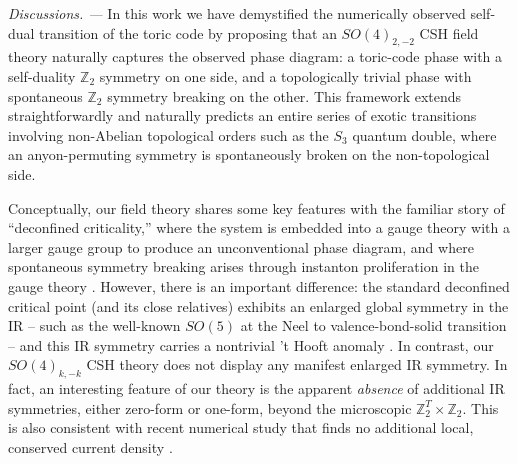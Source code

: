 \documentclass[aps, prl, superscriptaddress, twocolumn,
notitlepage, longbibliography,
floatfix]{revtex4-2}
\newcommand{\1}{\text{\uppercase\expandafter{\romannumeral1}}}
\newcommand{\2}{\text{\uppercase\expandafter{\romannumeral2}}}
\newcommand{\3}{\text{\uppercase\expandafter{\romannumeral3}}}
\newcommand{\4}{\text{\uppercase\expandafter{\romannumeral4}}}
\newcommand{\5}{\text{\uppercase\expandafter{\romannumeral5}}}
\newcommand{\6}{\text{\uppercase\expandafter{\romannumeral6}}}
\def\Z{\mathbb{Z}}
\begin{document}
\textit{Discussions. ---}
In this work we have demystified the numerically observed self-dual transition of the toric code by proposing that an $SO(4)_{2,-2}$ CSH field theory naturally captures the observed phase diagram: a toric-code phase with a self-duality $\mathbb{Z}_2$ symmetry on one side, and a topologically trivial phase with spontaneous $\mathbb{Z}_2$ symmetry breaking on the other. This framework extends straightforwardly and naturally predicts an entire series of exotic transitions involving non-Abelian topological orders such as the $S_3$ quantum double, where an anyon-permuting symmetry is spontaneously broken on the non-topological side.

Conceptually, our field theory shares some key features with the familiar story of ``deconfined criticality,'' where the system is embedded into a gauge theory with a larger gauge group to produce an unconventional phase diagram, and where spontaneous symmetry breaking arises through instanton proliferation in the gauge theory \cite{deconfine1,deconfine2}. However, there is an important difference: the standard deconfined critical point (and its close relatives) exhibits an enlarged global symmetry in the IR -- such as the well-known $SO(5)$ at the Neel to valence-bond-solid transition -- and this IR symmetry carries a nontrivial 't Hooft anomaly \cite{SO(5),SO5}. In contrast, our $SO(4)_{k,-k}$ CSH theory does not display any manifest enlarged IR symmetry. In fact, an interesting feature of our theory is the apparent \textit{absence} of additional IR symmetries, either zero-form or one-form, beyond the microscopic $\Z_2^T\times \Z_2$. This is also consistent with recent numerical study that finds no additional local, conserved current density \cite{OppenheimKochJanuszGazitRingel}. \par
\end{document}
